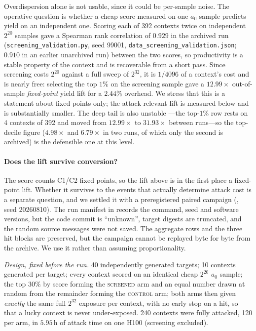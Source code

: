 \documentclass[11pt,a4paper]{article}
\begin{document}
Overdispersion alone is not usable, since it could be per-sample noise.  The
operative question is whether a cheap score measured on one $a_0$ sample
predicts yield on an independent one.  Scoring each of 392 contexts twice on
independent $2^{20}$ samples gave a Spearman rank correlation of $0.929$ in the archived run (\texttt{screening\_validation.py}, seed 99001, \texttt{data\_screening\_validation.json}; $0.910$ in an earlier unarchived run) between the two scores, so productivity is a stable property of the context and
is recoverable from a short pass.  Since screening costs $2^{20}$ against a full
sweep of $2^{32}$, it is $1/4096$ of a context's cost and is nearly free:
selecting the top $1\%$ on the screening sample gave a $12.99\times$
out-of-sample \emph{fixed-point} yield lift for a $2.44\%$ overhead.  We stress
that this is a statement about fixed points only; the attack-relevant lift is
measured below and is substantially smaller.  The deep tail is also unstable
---the top-$1\%$ row rests on 4 contexts of 392 and moved from $12.99\times$ to
$31.93\times$ between runs---so the top-decile figure ($4.98\times$ and $6.79\times$ in two runs, of which only the second is archived) is the defensible one at this level.

\paragraph{Does the lift survive conversion?}
The score counts C1/C2 fixed points, so the lift above is in the first place a
fixed-point lift.  Whether it survives to the events that actually determine
attack cost is a separate question, and we settled it with a preregistered
paired campaign (, seed 20260810).  The run
manifest in  records the command, seed
and software versions, but the code commit is ``unknown'', target digests are
truncated, and the random source messages were not saved.  The aggregate rows
and the three hit blocks are preserved, but the campaign cannot be replayed
byte for byte from the archive.  We use it rather than assuming proportionality.

\emph{Design, fixed before the run.}  40 independently generated targets; 10 contexts
generated per target; every context scored on an identical cheap $2^{20}$ $a_0$
sample; the top $30\%$ by score forming the \textsc{screened} arm and an equal
number drawn at random from the remainder forming the \textsc{control} arm;
both arms then given \emph{exactly} the same full $2^{32}$ exposure per
context, with no early stop on a hit, so that a lucky context is never
under-exposed.  240 contexts were fully attacked, 120 per arm, in $5.95$\,h of attack time
on one H100 (screening excluded).
\end{document}
